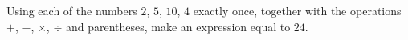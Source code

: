 Using each of the numbers $2$, $5$, $10$, $4$ exactly once, together with the operations $+$, $-$, $\times$, $\div$ and parentheses, make an expression equal to $24$.
